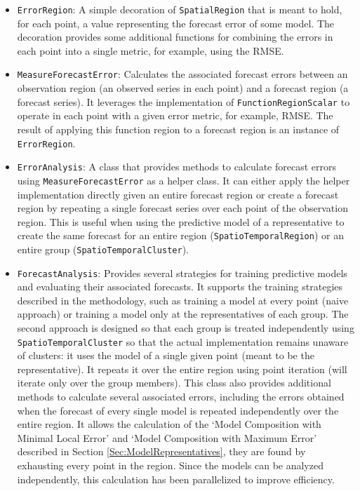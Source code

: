 \begin{itemize}
	\item \texttt{ErrorRegion}: A simple decoration of \texttt{SpatialRegion} that is meant to hold, for each point, a value representing the forecast error of some model. The decoration provides some additional functions for combining the errors in each point into a single metric, for example, using the RMSE.
	
	\item \texttt{MeasureForecastError}: Calculates the associated forecast errors between an observation region (an observed series in each point) and a forecast region (a forecast series). It leverages the implementation of \texttt{FunctionRegionScalar} to operate in each point with a given error metric, for example, RMSE. The result of applying this function region to a forecast region is an instance of \texttt{ErrorRegion}.
	
	\item \texttt{ErrorAnalysis}: A class that provides methods to calculate forecast errors using \texttt{MeasureForecastError} as a helper class. It can either apply the helper implementation directly given an entire forecast region or create a forecast region by repeating a single forecast series over each point of the observation region. This is useful when using the predictive model of a representative to create the same forecast for an entire region (\texttt{SpatioTemporalRegion}) or an entire group (\texttt{SpatioTemporalCluster}).
	
	\item \texttt{ForecastAnalysis}: Provides several strategies for training predictive models and evaluating their associated forecasts. It supports the training strategies described in the methodology, such as training a model at every point (naive approach) or training a model only at the representatives of each group. The second approach is designed so that each group is treated independently using \texttt{SpatioTemporalCluster} so that the actual implementation remains unaware of clusters: it uses the model of a single given point (meant to be the representative). It repeats it over the entire region using point iteration (will iterate only over the group members). This class also provides additional methods to calculate several associated errors, including the errors obtained when the forecast of every single model is repeated independently over the entire region. It allows the calculation of the `Model Composition with Minimal Local Error' and `Model Composition with Maximum Error' described in Section \ref{Sec:ModelRepresentatives}, they are found by exhausting every point in the region. Since the models can be analyzed independently, this calculation has been parallelized to improve efficiency.
\end{itemize}

